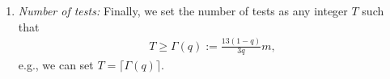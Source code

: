 \documentclass[onecolumn,letterpaper]{IEEEtran}
\DeclareMathOperator*{\argmin}{argmin}
\newcommand{\cp}{{q}}
\newcommand{\nt}{{m}}
\newcommand{\sid}[1]{\textcolor{red}{#1}}
\newcommand{\ftau}{{\Gamma}}
\newcommand{\ftaup}{{\hat{\Gamma}}}
\newcommand{\fT}{{\ftau(\cp)}}
\newcommand{\fTp}{\ftaup (\cp)}
\newcommand{\cpns}{\cp_0}
\newcommand{\xw}[1]{\textcolor{cyan}{#1}}
\begin{document}
\begin{enumerate}





\item {\it Number of tests:}  %
Finally, we set the number of tests as any integer $T$ such that
\begin{equation}
\label{eq:def:T}
\begin{aligned}
 T  \geq \fT:=  \frac{13(1-\cp)}{3\cp} \nt ,
    \end{aligned}
\end{equation}
e.g., we can set $T = \lceil \fT \rceil$.


\end{enumerate}
\end{document}
